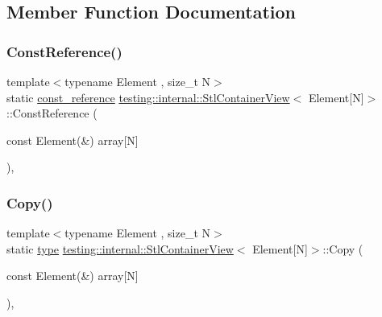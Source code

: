 \subsection{Member Function Documentation}
\mbox{\label{classtesting_1_1internal_1_1StlContainerView_3_01Element[N]_4_aa1b15d7f43d38751ae19f6dbdcb6aba3}} 
\subsubsection{\texorpdfstring{ConstReference()}{ConstReference()}}
{\footnotesize\ttfamily template$<$typename Element , size\+\_\+t N$>$ \\
static \mbox{\hyperlink{classtesting_1_1internal_1_1StlContainerView_3_01Element[N]_4_a481e6ab99316939484fad9c561af5e28}{const\+\_\+reference}} \mbox{\hyperlink{classtesting_1_1internal_1_1StlContainerView}{testing\+::internal\+::\+Stl\+Container\+View}}$<$ Element\mbox{[}N\mbox{]}$>$\+::Const\+Reference (\begin{DoxyParamCaption}\item[{const Element(\&)}]{array\mbox{[}\+N\mbox{]} }\end{DoxyParamCaption})\hspace{0.3cm}{\ttfamily [inline]}, {\ttfamily [static]}}

\mbox{\label{classtesting_1_1internal_1_1StlContainerView_3_01Element[N]_4_af2cf79fbd7f829229a47b52f863c68f8}} 
\subsubsection{\texorpdfstring{Copy()}{Copy()}}
{\footnotesize\ttfamily template$<$typename Element , size\+\_\+t N$>$ \\
static \mbox{\hyperlink{classtesting_1_1internal_1_1StlContainerView_3_01Element[N]_4_a364efca99cc5a02829b4e3413c506b09}{type}} \mbox{\hyperlink{classtesting_1_1internal_1_1StlContainerView}{testing\+::internal\+::\+Stl\+Container\+View}}$<$ Element\mbox{[}N\mbox{]}$>$\+::Copy (\begin{DoxyParamCaption}\item[{const Element(\&)}]{array\mbox{[}\+N\mbox{]} }\end{DoxyParamCaption})\hspace{0.3cm}{\ttfamily [inline]}, {\ttfamily [static]}}

